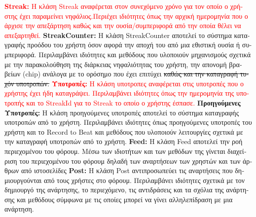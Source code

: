 \documentclass{article}
\begin{document}
\newline
\newline
\textcolor{red}{\textbf{Streak:} \textgreek{Η κλάση} Streak \textgreek{αναφέρεται στον συνεχόμενο χρόνο για τον οποίο ο χρήστης έχει παραμείνει νηφάλιος.Περιέχει ιδιότητες όπως την αρχική ημερομηνία που ο άρχισε την απεξάρτηση καθώς και την ουσία/συμπεριφορά από την οποία θέλει να απεξαρτηθεί.}}
\newline
\newline
\textbf{StreakCounter:} \textgreek{Η κλάση} StreakCounter \textgreek{αποτελεί το σύστημα καταγραφής προόδου του χρήστη όσον αφορά την αποχή του από μια εθιστική ουσία ή συμπεριφορά. Περιλαμβάνει ιδιότητες και μεθόδους που υλοποιούν μηχανισμούς σχετικά με την παρακολούθηση της διάρκειας νηφαλιότητας του χρήστη, την απονομή βραβείων} (chip) \textgreek{ανάλογα με το ορόσημο που έχει επιτύχει \st{καθώς και την καταγραφή τυχόν υποτροπών.}}
\newline
\newline
\newline
\textcolor{red}{\textbf{\textgreek{Υποτροπές:}} \textgreek{Η κλάση υποτροπες αναφέρεται στις υποτροπές που ο χρήστης έχει ήδη καταγράψει. Περιλαμβάνει ιδιότητες όπως την ημερομηνία της υποτροπής και το} StreakId \textgreek{για το} Streak \textgreek{το οποίο ο χρήστης έσπασε.}}
\newline
\newline
\textbf{\textgreek{Προηγούμενες Υποτροπές:}} \textgreek{Η κλάση προηγούμενες υποτροπές αποτελεί το σύστημα καταγραφής υποτροπών από το χρήστη. Περιλαμβάνει ιδιότητες όπως προηγούμενες υποτροπές του χρήστη και το Record to Beat και μεθόδους που υλοποιούν λειτουργίες σχετικά με την καταγραφή υποτροπών από το χρήστη.}
\newline
\newline
\textbf{Feed:} \textgreek{Η κλάση} Feed \textgreek{αποτελεί την ροή περιεχομένου του φόρουμ. Μέσω των ιδιοτήτων και των μεθόδων της γίνεται διαχείριση του περιεχομένου του φόρουμ δηλαδή των αναρτήσεων των χρηστών και των άρθρων από ιστοσελίδες}
\newline
\newline
\textbf{Post:} \textgreek{Η κλάση} Post \textgreek{αντιπροσωπεύει τις αναρτήσεις που δημιουργούνται από τους χρήστες στο φόρουμ. Περιλαμβάνει ιδιότητες σχετικά με τον δημιουργό της ανάρτησης, το περιεχόμενο, τις αντιδράσεις και τα σχόλια της ανάρτησης και μεθόδους σύμφωνα με τις οποίες μπορεί να γίνει αλληλεπίδραση με μια ανάρτηση.}
\newline
\newline
\end{document}
